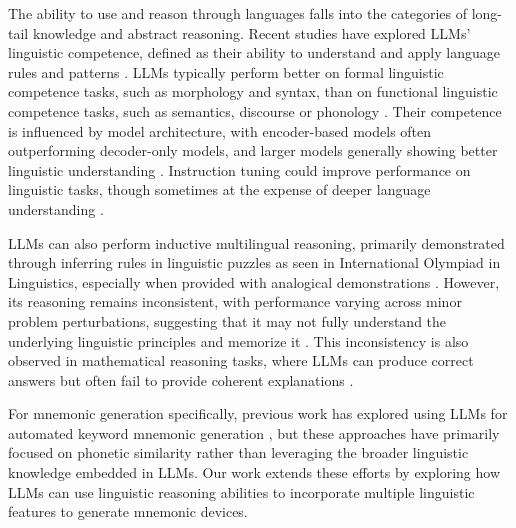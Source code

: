 The ability to use and reason through languages falls into the categories of long-tail knowledge and abstract reasoning. Recent studies have explored LLMs' linguistic competence, defined as their ability to understand and apply language rules and patterns \citep{waldisHOLMES2024}. LLMs typically perform better on formal linguistic competence tasks, such as morphology and syntax, than on functional linguistic competence tasks, such as semantics, discourse \citep{KhoujaLINGOLYTOO2025} or phonology \citep{suvarnaPhonologyBenchEvaluatingPhonological2024}. Their competence is influenced by model architecture, with encoder-based models often outperforming decoder-only models, and larger models generally showing better linguistic understanding \citep{waldisHOLMES2024}. Instruction tuning could improve performance on linguistic tasks, though sometimes at the expense of deeper language understanding \citep{waldisHOLMES2024,yinDidYouRead2023}.

LLMs can also perform inductive multilingual reasoning, primarily demonstrated through inferring rules in linguistic puzzles as seen in International Olympiad in Linguistics, especially when provided with analogical demonstrations \citep{RamjiINDUCTIVE2024}. However, its reasoning remains inconsistent, with performance varying across minor problem perturbations, suggesting that it may not fully understand the underlying linguistic principles and memorize it \citep{RamjiINDUCTIVE2024,KhoujaLINGOLYTOO2025}. This inconsistency is also observed in mathematical reasoning tasks, where LLMs can produce correct answers but often fail to provide coherent explanations \citep{weiChainofThoughtPromptingElicits2022}.

For mnemonic generation specifically, previous work has explored using LLMs for automated keyword mnemonic generation \citep{LeeSMARTPHONE2023, LeeEXPLORING2024, BalepurSMART2024}, but these approaches have primarily focused on phonetic similarity rather than leveraging the broader linguistic knowledge embedded in LLMs. Our work extends these efforts by exploring how LLMs can use linguistic reasoning abilities to incorporate multiple linguistic features to generate mnemonic devices.
